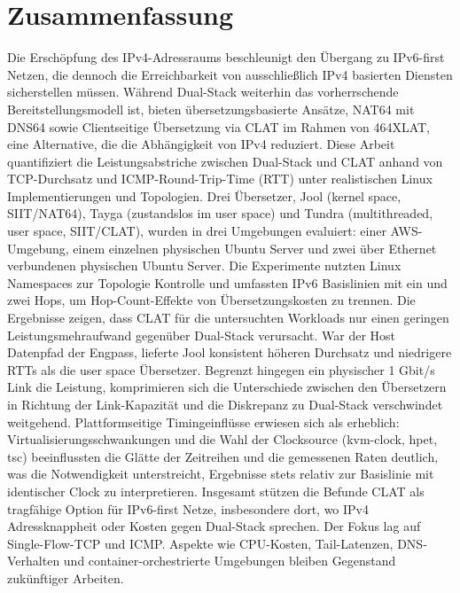 \section*{Zusammenfassung}
Die Erschöpfung des IPv4-Adressraums beschleunigt den Übergang zu IPv6-first Netzen, die dennoch die Erreichbarkeit von ausschließlich IPv4 basierten Diensten sicherstellen müssen. Während Dual-Stack weiterhin das vorherrschende Bereitstellungsmodell ist, bieten übersetzungsbasierte Ansätze, NAT64 mit DNS64 sowie Clientseitige Übersetzung via CLAT im Rahmen von 464XLAT, eine Alternative, die die Abhängigkeit von IPv4 reduziert. Diese Arbeit quantifiziert die Leistungsabstriche zwischen Dual-Stack und CLAT anhand von TCP-Durchsatz und ICMP-Round-Trip-Time (RTT) unter realistischen Linux Implementierungen und Topologien. Drei Übersetzer, Jool (kernel space, SIIT/NAT64), Tayga (zustandslos im user space) und Tundra (multithreaded, user space, SIIT/CLAT), wurden in drei Umgebungen evaluiert: einer AWS-Umgebung, einem einzelnen physischen Ubuntu Server und zwei über Ethernet verbundenen physischen Ubuntu Server. Die Experimente nutzten Linux Namespaces zur Topologie Kontrolle und umfassten IPv6 Basislinien mit ein und zwei Hops, um Hop-Count-Effekte von Übersetzungskosten zu trennen.
Die Ergebnisse zeigen, dass CLAT für die untersuchten Workloads nur einen geringen Leistungsmehraufwand gegenüber Dual-Stack verursacht. War der Host Datenpfad der Engpass, lieferte Jool konsistent höheren Durchsatz und niedrigere RTTs als die user space Übersetzer. Begrenzt hingegen ein physischer 1 Gbit/s Link die Leistung, komprimieren sich die Unterschiede zwischen den Übersetzern in Richtung der Link-Kapazität und die Diskrepanz zu Dual-Stack verschwindet weitgehend. Plattformseitige Timingeinflüsse erwiesen sich als erheblich: Virtualisierungsschwankungen und die Wahl der Clocksource (kvm-clock, hpet, tsc) beeinflussten die Glätte der Zeitreihen und die gemessenen Raten deutlich, was die Notwendigkeit unterstreicht, Ergebnisse stets relativ zur Basislinie mit identischer Clock zu interpretieren. Insgesamt stützen die Befunde CLAT als tragfähige Option für IPv6-first Netze, insbesondere dort, wo IPv4 Adressknappheit oder Kosten gegen Dual-Stack sprechen. Der Fokus lag auf Single-Flow-TCP und ICMP. Aspekte wie CPU-Kosten, Tail-Latenzen, DNS-Verhalten und container-orchestrierte Umgebungen bleiben Gegenstand zukünftiger Arbeiten.

